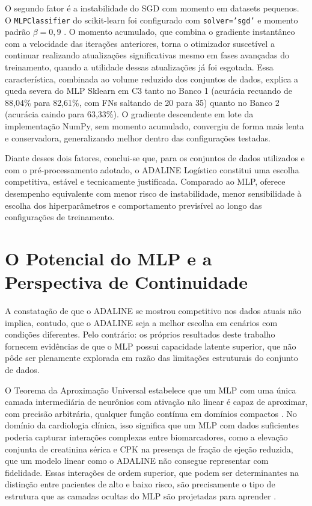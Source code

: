 O segundo fator é a instabilidade do SGD com momento em datasets pequenos. O \texttt{MLPClassifier} do scikit-learn foi configurado com \texttt{solver='sgd'} e momento padrão $\beta = 0{,}9$ \cite{pedregosa2011}. O momento acumulado, que combina o gradiente instantâneo com a velocidade das iterações anteriores, torna o otimizador suscetível a continuar realizando atualizações significativas mesmo em fases avançadas do treinamento, quando a utilidade dessas atualizações já foi esgotada. Essa característica, combinada ao volume reduzido dos conjuntos de dados, explica a queda severa do MLP Sklearn em C3 tanto no Banco 1 (acurácia recuando de 88,04\% para 82,61\%, com FNs saltando de 20 para 35) quanto no Banco 2 (acurácia caindo para 63,33\%). O gradiente descendente em lote da implementação NumPy, sem momento acumulado, convergiu de forma mais lenta e conservadora, generalizando melhor dentro das configurações testadas.

Diante desses dois fatores, conclui-se que, para os conjuntos de dados utilizados e com o pré-processamento adotado, o ADALINE Logístico constitui uma escolha competitiva, estável e tecnicamente justificada. Comparado ao MLP, oferece desempenho equivalente com menor risco de instabilidade, menor sensibilidade à escolha dos hiperparâmetros e comportamento previsível ao longo das configurações de treinamento.

\section{O Potencial do MLP e a Perspectiva de Continuidade}
\label{sec:potencial_mlp}

A constatação de que o ADALINE se mostrou competitivo nos dados atuais não implica, contudo, que o ADALINE seja a melhor escolha em cenários com condições diferentes. Pelo contrário: os próprios resultados deste trabalho fornecem evidências de que o MLP possui capacidade latente superior, que não pôde ser plenamente explorada em razão das limitações estruturais do conjunto de dados.

O Teorema da Aproximação Universal estabelece que um MLP com uma única camada intermediária de neurônios com ativação não linear é capaz de aproximar, com precisão arbitrária, qualquer função contínua em domínios compactos \cite{cybenko1989,hornik1991,braga2007}. No domínio da cardiologia clínica, isso significa que um MLP com dados suficientes poderia capturar interações complexas entre biomarcadores, como a elevação conjunta de creatinina sérica e CPK na presença de fração de ejeção reduzida, que um modelo linear como o ADALINE não consegue representar com fidelidade. Essas interações de ordem superior, que podem ser determinantes na distinção entre pacientes de alto e baixo risco, são precisamente o tipo de estrutura que as camadas ocultas do MLP são projetadas para aprender \cite{silva2016}.

